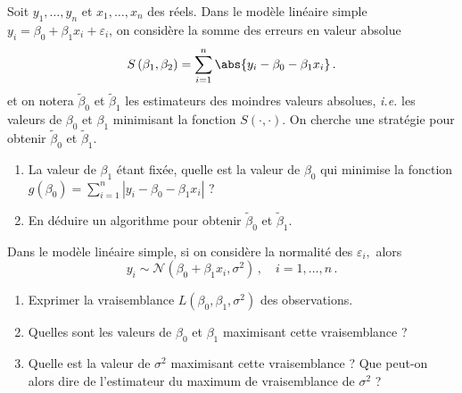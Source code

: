 \documentclass{../headers/td_upc}
\providecommand{\1}{\mathds{1}}
\begin{document}
	\cor{\newpage}
	
	\exo{\!\!\!\!\!\!\!\!*}
	Soit $y_{1}, \ldots, y_{n}$ et $x_{1}, \ldots, x_{n}$ des réels. 
	Dans le modèle linéaire simple $y_{i}=\beta_{0}+\beta_{1} x_{i}+\varepsilon_{i}$, 
	on considère la somme des erreurs en valeur absolue
	\[
	S\left(\beta_{1}, \beta_{2}\right)=\sum_{i=1}^{n}\abs{y_{i}-\beta_{0}-\beta_{1} x_{i}}\,.
	\]
	et on notera $\tilde{\beta}_{0}$ et $\tilde{\beta}_{1}$ les estimateurs des moindres valeurs absolues, 
	\textit{i.e.} les valeurs de $\beta_{0}$ et $\beta_{1}$ minimisant la fonction $S(\cdot, \cdot)$. 
	On cherche une stratégie pour obtenir $\tilde{\beta}_{0}$ et $\tilde{\beta}_{1}$.
	\begin{enumerate}
		\item La valeur de $\beta_{1}$ étant fixée, quelle est la valeur de $\beta_{0}$ qui minimise la fonction 
		$g\left(\beta_{0}\right)=\sum_{i=1}^{n}\left|y_{i}-\beta_{0}-\beta_{1} x_{i}\right|$ ?
		\item En déduire un algorithme pour obtenir $\tilde{\beta}_{0}$ et $\tilde{\beta}_{1}$.
	\end{enumerate}
	
	
	\cor{\newpage}
	
%	
	
	
	
	Dans le modèle linéaire simple, si on considère la normalité des $\varepsilon_{i},$ alors
	\[
	y_{i} \sim \mathcal{N}\left(\beta_{0}+\beta_{1} x_{i}, \sigma^{2}\right)\,, \quad i=1, \ldots, n\,.
	\]
	\begin{enumerate}
		\item  Exprimer la vraisemblance $L\left(\beta_{0}, \beta_{1}, \sigma^{2}\right)$ des observations.
		\item  Quelles sont les valeurs de $\beta_{0}$ et $\beta_{1}$ maximisant cette vraisemblance ?
		\item  Quelle est la valeur de $\sigma^{2}$ maximisant cette vraisemblance ? 
		Que peut-on alors dire de l'estimateur du maximum de vraisemblance de $\sigma^{2}$ ?
	\end{enumerate}
	
\end{document}
